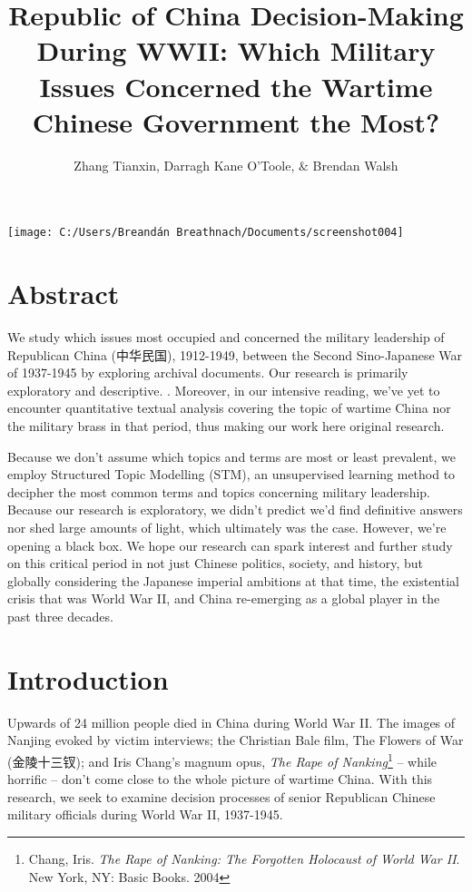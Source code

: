 \documentclass[12pt,letterpaper]{article}
\title{Republic of China Decision-Making During WWII: Which Military Issues Concerned the Wartime Chinese Government the Most?}
\author{Zhang Tianxin, Darragh Kane O'Toole, $\&$ Brendan Walsh}
\begin{document}
	\texttt{[image: C:/Users/Breandán Breathnach/Documents/screenshot004]}
	\newpage
	\begin{CJK*}{UTF8}{gbsn}
		\maketitle
		\section*{Abstract}
		\vspace{.1cm}
		We study which issues most occupied and concerned the military leadership of Republican China (中华民国), 1912-1949, between the Second Sino-Japanese War of 1937-1945 by exploring archival documents. Our research is primarily exploratory and descriptive. . Moreover, in our intensive reading, we’ve yet to encounter quantitative textual analysis covering the topic of wartime China nor the military brass in that period, thus making our work here original research.
		
		\vspace{.35cm}
		
		\noindent Because we don’t assume which topics and terms are most or least prevalent, we employ Structured Topic Modelling (STM), an unsupervised learning method to decipher the most common terms and topics concerning military leadership. Because our research is exploratory, we didn’t predict we’d find definitive answers nor shed large amounts of light, which ultimately was the case. However, we’re opening a black box. We hope our research can spark interest and further study on this critical period in not just Chinese politics, society, and history, but globally considering the Japanese imperial ambitions at that time, the existential crisis that was World War II, and China re-emerging as a global player in the past three decades.
		\newpage
		\maketitle
		\section*{Introduction}
		\vspace{.1cm}
		Upwards of 24 million people died in China during World War II. The images of Nanjing evoked by victim interviews; the Christian Bale film, The Flowers of War (金陵十三钗); and Iris Chang’s magnum opus, \textit{The Rape of Nanking}\footnote{Chang, Iris. \textit{The Rape of Nanking: The Forgotten Holocaust of World War II}. New York, NY: Basic Books. 2004} – while horrific – don’t come close to the whole picture of wartime China. With this research, we seek to examine decision processes of senior Republican Chinese military officials during World War II, 1937-1945. 
		

\end{CJK*}
\end{document}
